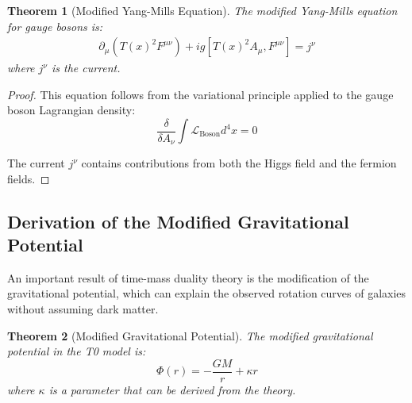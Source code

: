 \documentclass{article}
\newtheorem{theorem}{Theorem}[section]
\theoremstyle{definition}
\theoremstyle{remark}
\newcommand{\Tfield}{T(x)} %
\begin{document}
	\begin{theorem}[Modified Yang-Mills Equation]
		The modified Yang-Mills equation for gauge bosons is:
		\begin{multline}
			\partial_\mu(\Tfield^2 F^{\mu\nu}) + ig[\Tfield^2 A_\mu, F^{\mu\nu}] = j^\nu
		\end{multline}
		where $j^\nu$ is the current.
	\end{theorem}
	
	\begin{proof}
		This equation follows from the variational principle applied to the gauge boson Lagrangian density:
		\begin{equation}
			\frac{\delta}{\delta A_\nu}\int \mathcal{L}_{\text{Boson}} d^4x = 0
		\end{equation}
		
		The current $j^\nu$ contains contributions from both the Higgs field and the fermion fields.
	\end{proof}
	
	\subsection{Derivation of the Modified Gravitational Potential}
	
	An important result of time-mass duality theory is the modification of the gravitational potential, which can explain the observed rotation curves of galaxies without assuming dark matter.
	
	\begin{theorem}[Modified Gravitational Potential]
		The modified gravitational potential in the T0 model is:
		\begin{equation}
			\Phi(r) = -\frac{GM}{r} + \kappa r
		\end{equation}
		where $\kappa$ is a parameter that can be derived from the theory.
	\end{theorem}
	
\end{document}
